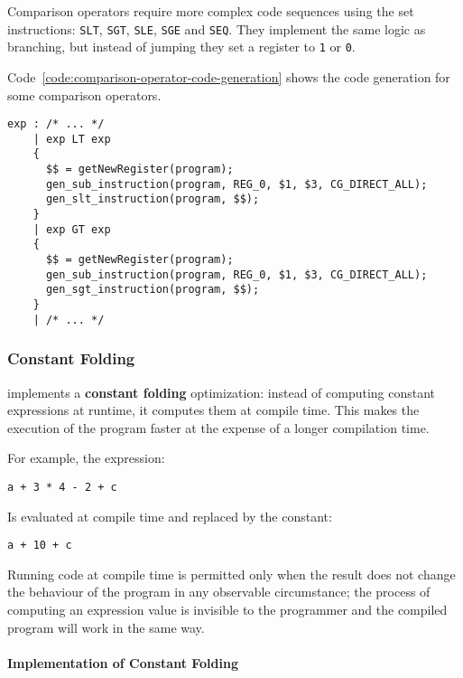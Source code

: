 \documentclass[english]{article}
\begin{document}
Comparison operators require more complex code sequences using the set instructions:
\texttt{SLT}, \texttt{SGT}, \texttt{SLE}, \texttt{SGE} and \texttt{SEQ}.
They implement the same logic as branching, but instead of jumping they set a register to \texttt{1} or \texttt{0}.

Code~\ref{code:comparison-operator-code-generation} shows the code generation for some comparison operators.

\begin{onepage}
  \begin{lstlisting}[language=LANCE, caption={Comparison operator code generation}, label={code:comparison-operator-code-generation}]
exp : /* ... */
    | exp LT exp
    {
      $$ = getNewRegister(program);
      gen_sub_instruction(program, REG_0, $1, $3, CG_DIRECT_ALL);
      gen_slt_instruction(program, $$);
    }
    | exp GT exp
    {
      $$ = getNewRegister(program);
      gen_sub_instruction(program, REG_0, $1, $3, CG_DIRECT_ALL);
      gen_sgt_instruction(program, $$);
    }
    | /* ... */
\end{lstlisting}
\end{onepage}

\subsubsection{Constant Folding}

\acse implements a \textbf{constant folding} optimization:
instead of computing constant expressions at runtime, it computes them at compile time.
This makes the execution of the program faster at the expense of a longer compilation time.

For example, the expression:
\begin{center}
  \texttt{a + 3 * 4 - 2 + c}
\end{center}
Is evaluated at compile time and replaced by the constant:
\begin{center}
  \texttt{a + 10 + c}
\end{center}

Running code at compile time is permitted only when the result does not change the behaviour of the program in any observable circumstance;
the process of computing an expression value is invisible to the programmer and the compiled program will work in the same way.

\paragraph{Implementation of Constant Folding}
\end{document}
